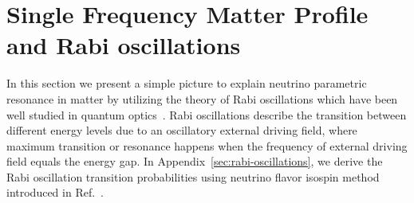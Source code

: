 \documentclass[%
reprint,
 amsmath,amssymb,
 prd,
]{revtex4-1}
\begin{document}



\section{\label{sec:single}Single Frequency Matter Profile and Rabi oscillations}%


In this section we present a simple picture to explain neutrino parametric resonance in matter by utilizing the theory of Rabi oscillations which have been well studied in quantum optics~\cite{Boyd2008}. Rabi oscillations describe the transition between different energy levels due to an oscillatory external driving field, where maximum transition or resonance happens when the frequency of external driving field equals the energy gap. In Appendix~\ref{sec:rabi-oscillations}, we derive the Rabi oscillation transition probabilities using neutrino flavor isospin method introduced in Ref.~.




\end{document}
